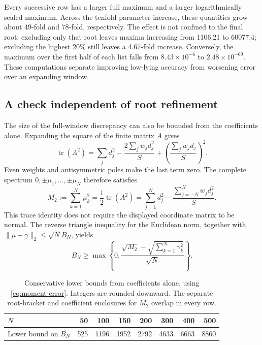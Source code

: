\documentclass[11pt,a4paper]{article}
\begin{document}
Every successive row has a larger full maximum and a larger
logarithmically scaled maximum. Across the tenfold parameter increase,
these quantities grow about 49-fold and 78-fold, respectively.
The effect is not confined to the final root: excluding only that root
leaves maxima increasing from 1106.21 to 60077.4; excluding the highest
20\% still leaves a 4.67-fold increase. Conversely, the maximum over
the first half of each list falls from $8.43\times10^{-6}$ to
$2.48\times10^{-69}$. These computations separate improving low-lying
accuracy from worsening error over an expanding window.

\subsection*{A check independent of root refinement}

The size of the full-window discrepancy can also be bounded from the
coefficients alone. Expanding the square of the finite matrix $A$ gives
\[
 \operatorname{tr}(A^2)=\sum_j d_j^2
 -\frac{2\sum_j w_jd_j^2}{S}
 +\left(\frac{\sum_jw_jd_j}{S}\right)^2.
\]
Even weights and antisymmetric poles make the last term zero. The
complete spectrum $0,\pm\mu_1,\ldots,\pm\mu_N$ therefore satisfies
\begin{equation}
 M_2:=\sum_{k=1}^N\mu_k^2
 =\frac12\operatorname{tr}(A^2)
 =\sum_{j=1}^N d_j^2-\frac{\sum_{j=-N}^N w_jd_j^2}{S}.
 \label{eq:spectral-moment}
\end{equation}
This trace identity does not require the displayed coordinate matrix
to be normal. The reverse triangle inequality for the Euclidean norm,
together with $\|\mu-\gamma\|_2\leq\sqrt N B_N$, yields
\begin{equation}
 B_N\geq\max\left\{0,
 \frac{\sqrt{M_2}-\sqrt{\sum_{k=1}^N\gamma_k^2}}{\sqrt N}\right\}.
 \label{eq:moment-error}
\end{equation}

\begin{table}[htbp]
\centering\small
\caption{Conservative lower bounds from coefficients alone, using
\eqref{eq:moment-error}. Integers are rounded downward. The separate
root-bracket and coefficient enclosures for $M_2$ overlap in every row.}
\label{tab:moment}
\begin{tabular}{@{}lrrrrrrr@{}}
\toprule
$N$ & 50 & 100 & 150 & 200 & 300 & 400 & 500 \\
\midrule
Lower bound on $B_N$ & 525 & 1196 & 1952 & 2792 & 4633 & 6663 & 8860 \\
\bottomrule
\end{tabular}
\end{table}
\end{document}
